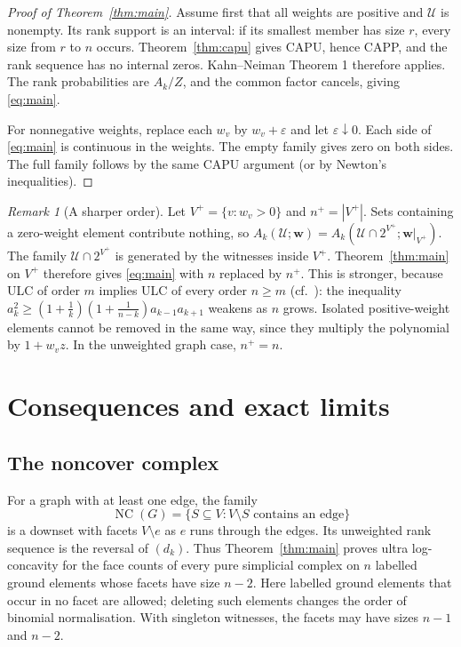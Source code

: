 \documentclass[11pt,a4paper]{article}
\theoremstyle{remark}
\newtheorem{remark}[theorem]{Remark}
\newcommand{\U}{\mathcal U}
\newcommand{\wt}{\boldsymbol w}
\begin{document}
\begin{proof}[Proof of Theorem~\ref{thm:main}]
Assume first that all weights are positive and $\U$ is nonempty. Its rank support is an interval: if its smallest member has size $r$, every size from $r$ to $n$ occurs. Theorem~\ref{thm:capu} gives CAPU, hence CAPP, and the rank sequence has no internal zeros. Kahn--Neiman Theorem 1 therefore applies. The rank probabilities are $A_k/Z$, and the common factor cancels, giving \eqref{eq:main}.

For nonnegative weights, replace each $w_v$ by $w_v+\varepsilon$ and let $\varepsilon\downarrow0$. Each side of \eqref{eq:main} is continuous in the weights. The empty family gives zero on both sides. The full family follows by the same CAPU argument (or by Newton's inequalities).
\end{proof}

\begin{remark}[A sharper order]\label{rem:order}
Let $V^+=\{v:w_v>0\}$ and $n^+=|V^+|$. Sets containing a zero-weight element contribute nothing, so $A_k(\U;\wt)=A_k(\U\cap2^{V^+};\wt|_{V^+})$. The family $\U\cap2^{V^+}$ is generated by the witnesses inside $V^+$. Theorem~\ref{thm:main} on $V^+$ therefore gives \eqref{eq:main} with $n$ replaced by $n^+$. This is stronger, because ULC of order $m$ implies ULC of every order $n\ge m$ (cf.\ \cite{Liggett}): the inequality $a_k^2\ge(1+\frac1k)(1+\frac1{n-k})a_{k-1}a_{k+1}$ weakens as $n$ grows. Isolated positive-weight elements cannot be removed in the same way, since they multiply the polynomial by $1+w_vz$. In the unweighted graph case, $n^+=n$.
\end{remark}

\section{Consequences and exact limits}

\subsection{The noncover complex}

For a graph with at least one edge, the family
\[
\operatorname{NC}(G)=\{S\subseteq V:V\setminus S\text{ contains an edge}\}
\]
is a downset with facets $V\setminus e$ as $e$ runs through the edges. Its unweighted rank sequence is the reversal of $(d_k)$. Thus Theorem~\ref{thm:main} proves ultra log-concavity for the face counts of every pure simplicial complex on $n$ labelled ground elements whose facets have size $n-2$. Here labelled ground elements that occur in no facet are allowed; deleting such elements changes the order of binomial normalisation. With singleton witnesses, the facets may have sizes $n-1$ and $n-2$.
\end{document}
